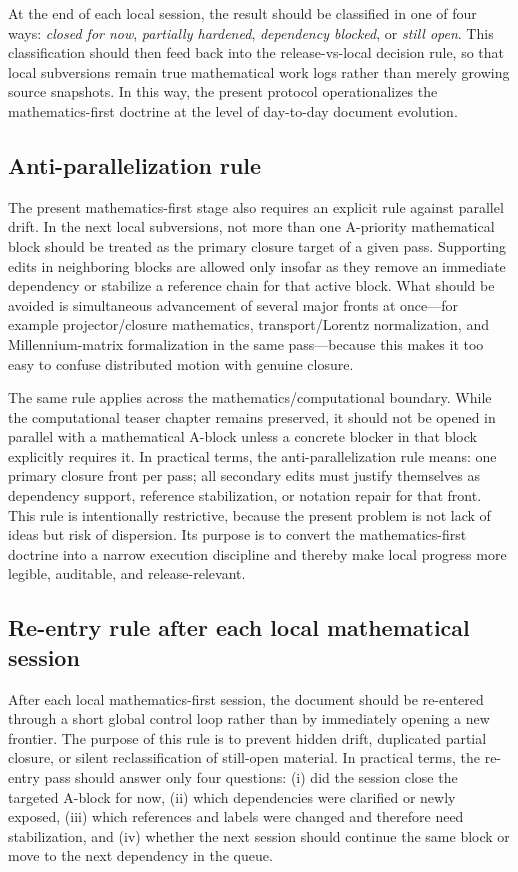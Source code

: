 \documentclass[12pt,a4paper]{article}
\begin{document}
At the end of each local session, the result should be classified in one of four ways: \emph{closed for now}, \emph{partially hardened}, \emph{dependency blocked}, or \emph{still open}. This classification should then feed back into the release-vs-local decision rule, so that local subversions remain true mathematical work logs rather than merely growing source snapshots. In this way, the present protocol operationalizes the mathematics-first doctrine at the level of day-to-day document evolution.



\subsection*{Anti-parallelization rule}
The present mathematics-first stage also requires an explicit rule against parallel drift. In the next local subversions, not more than one A-priority mathematical block should be treated as the primary closure target of a given pass. Supporting edits in neighboring blocks are allowed only insofar as they remove an immediate dependency or stabilize a reference chain for that active block. What should be avoided is simultaneous advancement of several major fronts at once---for example projector/closure mathematics, transport/Lorentz normalization, and Millennium-matrix formalization in the same pass---because this makes it too easy to confuse distributed motion with genuine closure.

The same rule applies across the mathematics/computational boundary. While the computational teaser chapter remains preserved, it should not be opened in parallel with a mathematical A-block unless a concrete blocker in that block explicitly requires it. In practical terms, the anti-parallelization rule means: one primary closure front per pass; all secondary edits must justify themselves as dependency support, reference stabilization, or notation repair for that front. This rule is intentionally restrictive, because the present problem is not lack of ideas but risk of dispersion. Its purpose is to convert the mathematics-first doctrine into a narrow execution discipline and thereby make local progress more legible, auditable, and release-relevant.



\subsection{Re-entry rule after each local mathematical session}
After each local mathematics-first session, the document should be re-entered through a short global control loop rather than by immediately opening a new frontier. The purpose of this rule is to prevent hidden drift, duplicated partial closure, or silent reclassification of still-open material. In practical terms, the re-entry pass should answer only four questions: (i) did the session close the targeted A-block for now, (ii) which dependencies were clarified or newly exposed, (iii) which references and labels were changed and therefore need stabilization, and (iv) whether the next session should continue the same block or move to the next dependency in the queue.
\end{document}
